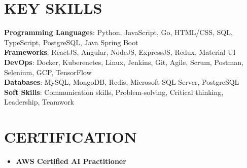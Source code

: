 \documentclass[letterpaper,11pt]{article}
\newcommand{\resumeItem}[1]{
  \item\small{
    {#1 \vspace{-2pt}}
  }
}
\newcommand{\resumeItemListStart}{\begin{itemize}[leftmargin=0.15in]}
\newcommand{\resumeItemListEnd}{\end{itemize}\vspace{-5pt}}
\begin{document}
\section{KEY SKILLS}
 \begin{itemize}[leftmargin=0.05in, label={}]
    \small{\item{
     \textbf{Programming Languages}{: Python, JavaScript, Go, HTML/CSS, SQL, TypeScript, PostgreSQL, Java Spring Boot} \\
     \textbf{Frameworks}{: ReactJS, Angular, NodeJS, ExpressJS, Redux, Material UI } \\
     \textbf{DevOps}{: Docker, Kuberenetes, Linux, Jenkins, Git, Agile, Scrum, Postman, Selenium, GCP, TensorFlow} \\
     \textbf{Databases}{: MySQL, MongoDB, Redis, Microsoft SQL Server, PostgreSQL} \\
     \textbf{Soft Skills}{: Communication skills, Problem-solving, Critical thinking, Leadership, Teamwork} \\
    }}
 \end{itemize}
 \vspace{-16pt}


\vspace{3pt}
\section{CERTIFICATION}
\resumeItemListStart
    \resumeItem{\textbf{AWS Certified AI Practitioner} \href{https://www.credly.com/badges/97a62e7f-d930-41de-a7eb-c7d644104deb/public_url}{\faLink}}
\resumeItemListEnd

          
\end{document}

